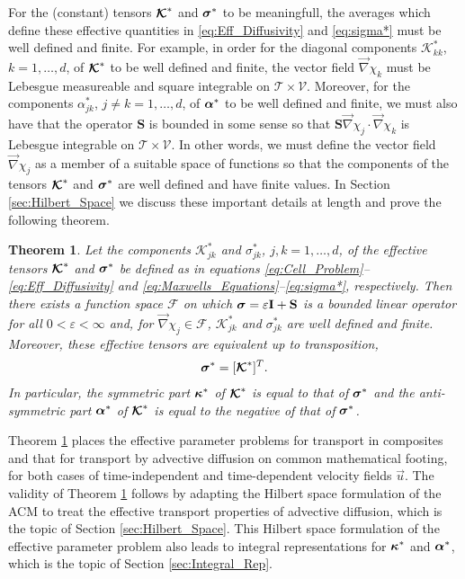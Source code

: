 \documentclass[11pt]{amsart}
\newcommand{\Ib}{\mathbf{I}}
\newcommand{\Sb}{\mathbf{S}}
\newcommand{\Kc}{\mathcal{K}}
\newcommand\Kbc{\mbox{\boldmath${\mathcal{K}}$}}
\newcommand{\Tc}{\mathcal{T}}
\newcommand{\Vc}{\mathcal{V}}
\newcommand{\Fs}{\mathscr{F}}
\newcommand\bsig{\mbox{\boldmath${\sigma}$}}
\newcommand\balpha{\mbox{\boldmath${\alpha}$}}
\newcommand\bkappa{\mbox{\boldmath${\kappa}$}}
\newtheorem{theorem}{Theorem}[section]
\begin{document}
For the (constant) tensors $\Kbc^*$ and $\bsig^*$ to be
meaningfull, the averages which define these effective quantities in
\eqref{eq:Eff_Diffusivity} and \eqref{eq:sigma*} must be well defined
and finite. For example, in order for the diagonal components
$\Kc^*_{kk}$, $k=1,\ldots,d$, of $\Kbc^*$ to be well defined and finite,
the vector field $\vec{\nabla}\chi_k$ must be Lebesgue measureable 
and square integrable on $\Tc\times\Vc$. Moreover, for the components
$\alpha^*_{jk}$, $j\neq k=1,\ldots,d$, of $\balpha^*$ to be well defined and
finite, we must also have that the operator $\Sb$ is bounded in some
sense so that $\Sb\vec{\nabla}\chi_j\cdot\vec{\nabla}\chi_k$ is Lebesgue integrable on
$\Tc\times\Vc$. In other words, we must define the vector field
$\vec{\nabla}\chi_j$ as a member of a suitable space of functions so that the
components of the tensors $\Kbc^*$ and $\bsig^*$ are well defined and
have finite values. In Section \ref{sec:Hilbert_Space} we discuss
these important details at length and prove the following theorem. 
%
\begin{theorem}\label{thm:kappa_sigma}
%
Let the components $\Kc^*_{jk}$ and $\sigma^*_{jk}$, $j,k=1,\ldots,d$, of the
effective tensors $\Kbc^*$ and $\bsig^*$ be defined as in equations
\eqref{eq:Cell_Problem}--\eqref{eq:Eff_Diffusivity} and
\eqref{eq:Maxwells_Equations}--\eqref{eq:sigma*}, respectively. Then
there exists a function space $\Fs$ on which $\bsig=\varepsilon\Ib+\Sb$ is a
bounded linear operator for all $0<\varepsilon<\infty$ and, for $\vec{\nabla}\chi_j\in\Fs$,
$\Kc^*_{jk}$ and $\sigma^*_{jk}$ are well defined and finite.
Moreover, these effective tensors are
equivalent up to transposition,  
% 
\begin{align}\label{eq:Eff_Equiv}
  \bsig^*=[\Kbc^*]^T.
\end{align}
%
In particular, the symmetric part $\bkappa^*$ of $\Kbc^*$ is equal to
that of $\bsig^*$ and the anti-symmetric part $\balpha^*$ of $\Kbc^*$
is equal to the negative of that of $\bsig^*$.
%
\end{theorem}
%



Theorem \ref{thm:kappa_sigma} places the effective parameter problems
for transport in composites and that for transport by advective
diffusion on common mathematical footing, for both cases of  
time-independent and time-dependent velocity fields $\vec{u}$. The
validity of Theorem \ref{thm:kappa_sigma} follows by adapting the
Hilbert space formulation of the ACM to treat the effective transport
properties of advective diffusion, which is the topic of Section
\ref{sec:Hilbert_Space}. This Hilbert space formulation of the
effective parameter problem also leads to integral representations for
$\bkappa^*$ and $\balpha^*$, which is the topic of Section
\ref{sec:Integral_Rep}.              
\end{document}
